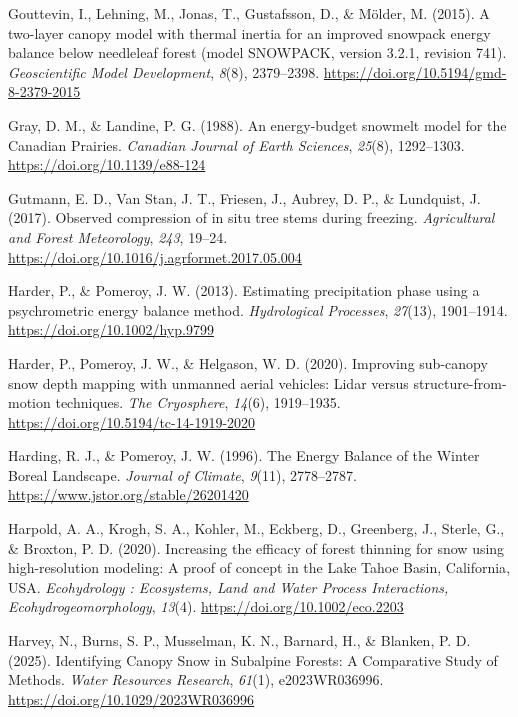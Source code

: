 \documentclass[
  letterpaper,
]{tex/uofsthesis-cs}
\newlength{\cslhangindent}
\newenvironment{CSLReferences}[2] %
 {\begin{list}{}{%
  \setlength{\itemindent}{0pt}
  \setlength{\leftmargin}{0pt}
  \setlength{\parsep}{0pt}
  \ifodd #1
   \setlength{\leftmargin}{\cslhangindent}
   \setlength{\itemindent}{-1\cslhangindent}
  \fi
  \setlength{\itemsep}{#2\baselineskip}}}
 {\end{list}}
\begin{document}
\begin{CSLReferences}{1}{0}
Gouttevin, I., Lehning, M., Jonas, T., Gustafsson, D., \& Mölder, M.
(2015). A two-layer canopy model with thermal inertia for an improved
snowpack energy balance below needleleaf forest (model {SNOWPACK},
version 3.2.1, revision 741). \emph{Geoscientific Model Development},
\emph{8}(8), 2379--2398. \url{https://doi.org/10.5194/gmd-8-2379-2015}

Gray, D. M., \& Landine, P. G. (1988). An energy-budget snowmelt model
for the {Canadian Prairies}. \emph{Canadian Journal of Earth Sciences},
\emph{25}(8), 1292--1303. \url{https://doi.org/10.1139/e88-124}

Gutmann, E. D., Van Stan, J. T., Friesen, J., Aubrey, D. P., \&
Lundquist, J. (2017). Observed compression of in situ tree stems during
freezing. \emph{Agricultural and Forest Meteorology}, \emph{243},
19--24. \url{https://doi.org/10.1016/j.agrformet.2017.05.004}

Harder, P., \& Pomeroy, J. W. (2013). Estimating precipitation phase
using a psychrometric energy balance method. \emph{Hydrological
Processes}, \emph{27}(13), 1901--1914.
\url{https://doi.org/10.1002/hyp.9799}

Harder, P., Pomeroy, J. W., \& Helgason, W. D. (2020). Improving
sub-canopy snow depth mapping with unmanned aerial vehicles: {Lidar}
versus structure-from-motion techniques. \emph{The Cryosphere},
\emph{14}(6), 1919--1935. \url{https://doi.org/10.5194/tc-14-1919-2020}

Harding, R. J., \& Pomeroy, J. W. (1996). The {Energy Balance} of the
{Winter Boreal Landscape}. \emph{Journal of Climate}, \emph{9}(11),
2778--2787. \url{https://www.jstor.org/stable/26201420}

Harpold, A. A., Krogh, S. A., Kohler, M., Eckberg, D., Greenberg, J.,
Sterle, G., \& Broxton, P. D. (2020). Increasing the efficacy of forest
thinning for snow using high-resolution modeling: {A} proof of concept
in the {Lake Tahoe Basin}, {California}, {USA}. \emph{Ecohydrology :
Ecosystems, Land and Water Process Interactions, Ecohydrogeomorphology},
\emph{13}(4). \url{https://doi.org/10.1002/eco.2203}

Harvey, N., Burns, S. P., Musselman, K. N., Barnard, H., \& Blanken, P.
D. (2025). Identifying {Canopy Snow} in {Subalpine Forests}: {A
Comparative Study} of {Methods}. \emph{Water Resources Research},
\emph{61}(1), e2023WR036996. \url{https://doi.org/10.1029/2023WR036996}


\end{CSLReferences}
\end{document}
